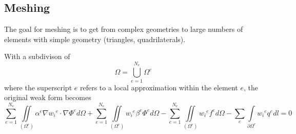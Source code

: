 \subsection{Meshing}
The goal for meshing is to get from complex geometries to large numbers of elements with simple geometry (triangles, quadrilaterals).\newline

With a subdivison of
\begin{equation*}
	\Omega = \bigcup\limits_{e=1}^{N_e} \Omega^e
\end{equation*}
where the superscript $e$ refers to a local approximation within the element $e$, the original weak form becomes
\begin{equation*}
	\sum_{e=1}^{N_e} \iint\limits_{\left(\Omega^e\right)} \alpha^e \nabla {w_i}^e \cdot \nabla \Phi^e d\Omega + \sum_{e=1}^{N_e} \iint\limits_{\left(\Omega^e\right)} {w_i}^e\beta^e\Phi^e d\Omega - \sum_{e=1}^{N_e} \iint\limits_{\left(\Omega^e\right)}{w_i}^e f^e d\Omega  - \sum_{e} \int\limits_{\partial \Omega^e} {w_i}^e q^e dl = 0
\end{equation*} 

